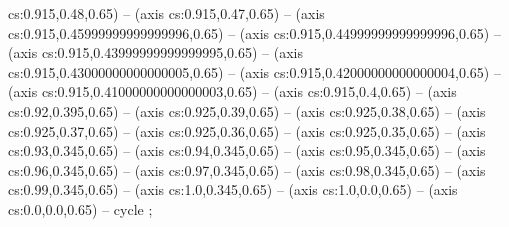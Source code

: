cs:0.915,0.48,0.65) -- (axis cs:0.915,0.47,0.65) -- (axis cs:0.915,0.45999999999999996,0.65) -- (axis cs:0.915,0.44999999999999996,0.65) -- (axis cs:0.915,0.43999999999999995,0.65) -- (axis cs:0.915,0.43000000000000005,0.65) -- (axis cs:0.915,0.42000000000000004,0.65) -- (axis cs:0.915,0.41000000000000003,0.65) -- (axis cs:0.915,0.4,0.65) -- (axis cs:0.92,0.395,0.65) -- (axis cs:0.925,0.39,0.65) -- (axis cs:0.925,0.38,0.65) -- (axis cs:0.925,0.37,0.65) -- (axis cs:0.925,0.36,0.65) -- (axis cs:0.925,0.35,0.65) -- (axis cs:0.93,0.345,0.65) -- (axis cs:0.94,0.345,0.65) -- (axis cs:0.95,0.345,0.65) -- (axis cs:0.96,0.345,0.65) -- (axis cs:0.97,0.345,0.65) -- (axis cs:0.98,0.345,0.65) -- (axis cs:0.99,0.345,0.65) -- (axis cs:1.0,0.345,0.65) -- (axis cs:1.0,0.0,0.65) -- (axis cs:0.0,0.0,0.65) -- cycle
;
